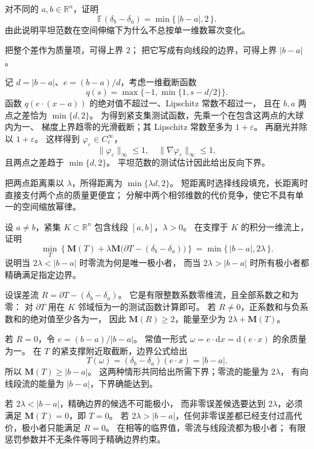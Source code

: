 \begin{exercise}\label{b1:ex:app-d-flat-two-points}
对不同的 \(a,b\in\mathbb R^n\)，证明
\[
 \mathbb F(\delta_b-\delta_a)=\min\{\,|b-a|,2\,\}.
\]
由此说明平坦范数在空间伸缩下为什么不总按单一维数幂次变化。
\end{exercise}
\begin{solution}
把整个差作为质量项，可得上界 \(2\)；
把它写成有向线段的边界，可得上界 \(|b-a|\)。

记 \(d=|b-a|\)、\(e=(b-a)/d\)，考虑一维截断函数
\[
 q(s)=\max\{-1,\min\{1,s-d/2\}\}.
\]
函数 \(q(e\cdot(x-a))\) 的绝对值不超过一、Lipschitz 常数不超过一，
且在 \(b,a\) 两点之差恰为 \(\min\{d,2\}\)。
为得到紧支集测试函数，先乘一个在包含这两点的大球内为一、
梯度上界趋零的光滑截断；其 Lipschitz 常数至多为 \(1+\varepsilon\)。
再磨光并除以 \(1+\varepsilon\)。
这样得到 \(\varphi_\varepsilon\in C_c^\infty\)，
\[
 \|\varphi_\varepsilon\|_\infty\leq1,\quad
 \|\nabla\varphi_\varepsilon\|_\infty\leq1,
\]
且两点之差趋于 \(\min\{d,2\}\)。
平坦范数的测试估计因此给出反向下界。

把两点距离乘以 \(\lambda\)，所得距离为 \(\min\{\lambda d,2\}\)。
短距离时选择线段填充，长距离时直接支付两个点的质量更便宜；
分解中两个相邻维数的代价竞争，使它不具有单一的空间缩放幂律。
\end{solution}

\begin{exercise}\label{b1:ex:app-d-penalty-threshold}
设 \(a\neq b\)，紧集 \(K\subset\mathbb R^n\) 包含线段 \([a,b]\)，\(\lambda>0\)。
在支撑于 \(K\) 的积分一维流上，证明
\[
 \min_T\left\{\mathbf M(T)
       +\lambda\mathbf M\bigl(\partial T-(\delta_b-\delta_a)\bigr)\right\}
       =\min\{\,|b-a|,2\lambda\,\}.
\]
说明当 \(2\lambda<|b-a|\) 时零流为何是唯一极小者，
而当 \(2\lambda>|b-a|\) 时所有极小者都精确满足指定边界。
\end{exercise}
\begin{solution}
设误差流 \(R=\partial T-(\delta_b-\delta_a)\)。
它是有限整数系数零维流，且全部系数之和为零：
对 \(\partial T\) 用在 \(K\) 邻域恒为一的测试函数计算即可。
若 \(R\neq0\)，正系数和与负系数和的绝对值至少各为一，
因此 \(\mathbf M(R)\geq2\)，能量至少为 \(2\lambda+\mathbf M(T)\)。

若 \(R=0\)，令 \(e=(b-a)/|b-a|\)。
常值一形式 \(\omega=e\cdot \mathrm{d}x=\mathrm{d}(e\cdot x)\) 的余质量为一。
在 \(T\) 的紧支撑附近取截断，边界公式给出
\[
 T(\omega)=(\delta_b-\delta_a)(e\cdot x)=|b-a|.
\]
所以 \(\mathbf M(T)\geq|b-a|\)。
这两种情形共同给出所需下界；零流的能量为 \(2\lambda\)，
有向线段流的能量为 \(|b-a|\)，下界确能达到。

若 \(2\lambda<|b-a|\)，精确边界的候选不可能极小，
而非零误差候选要达到 \(2\lambda\)，必须满足 \(\mathbf M(T)=0\)，即 \(T=0\)。
若 \(2\lambda>|b-a|\)，任何非零误差都已经支付过高代价，极小者只能满足 \(R=0\)。
在相等的临界值，零流与线段流都为极小者；
有限惩罚参数并不无条件等同于精确边界约束。
\end{solution}
